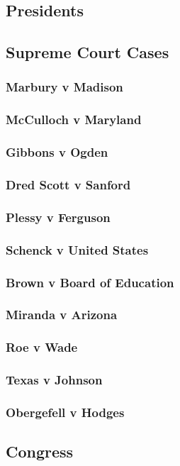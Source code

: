 		\subsection{Presidents}
		\newpage
		\subsection{Supreme Court Cases}
			\subsubsection{Marbury v Madison}
			\subsubsection{McCulloch v Maryland}
			\subsubsection{Gibbons v Ogden}
			\subsubsection{Dred Scott v Sanford}
			\subsubsection{Plessy v Ferguson}
			\subsubsection{Schenck v United States}
			\subsubsection{Brown v Board of Education}
			\subsubsection{Miranda v Arizona}
			\subsubsection{Roe v Wade}
			\subsubsection{Texas v Johnson}
			\subsubsection{Obergefell v Hodges}
		\subsection{Congress}
		
